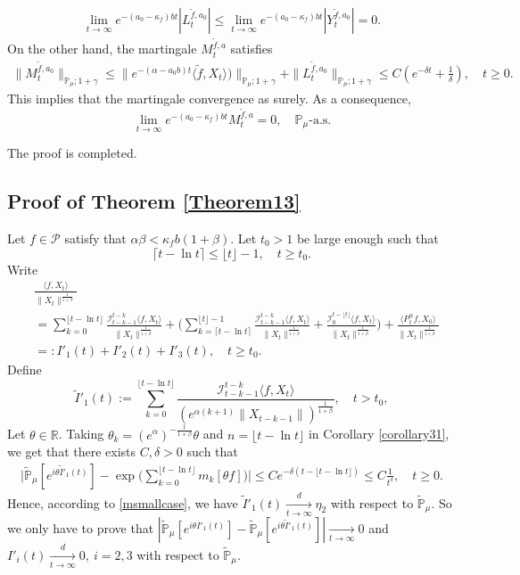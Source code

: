 \documentclass[12pt]{amsart}
\theoremstyle{plain}
\theoremstyle{definition}
\numberwithin{equation}{section}
\begin{document}
\begin{align*}
    \lim_{t\rightarrow \infty}e^{-(a_0 - \kappa_f)bt}|L_t^{\tilde{f},a_0}|
    \leq  \lim_{t\rightarrow \infty}e^{-(a_0 - \kappa_f)bt}|Y_t^{\tilde{f},a_0}|=0.
\end{align*}
	On the other hand, the martingale $M_t^{\tilde{f},a}$ satisfies
\begin{align*}
    \|M_t^{\tilde{f},a_0}\|_{\mathbb{P}_{\mu};1+\gamma}\leq  \|e^{-(\alpha-a_0 b)t}\langle \tilde{f},X_t\rangle)\|_{\mathbb{P}_{\mu};1+\gamma}+\|L_t^{\tilde{f},a_0}\|_{\mathbb{P}_{\mu};1+\gamma}\leq C(e^{-\delta t}+\frac{1}{\delta}),\quad t\geq 0.
\end{align*}
	This implies that the martingale convergence as surely. 
	As a consequence, 
\[
	\lim_{t\rightarrow\infty} e^{-(a_0-\kappa_f)bt}M_t^{\tilde{f},a}
	=0,
	\quad \mathbb P_\mu\text{-a.s.}
\] 
	
	The proof is completed.
\subsection{Proof of Theorem \ref{Theorem13}}
	Let $f\in \mathcal P$ satisfy that $\alpha \beta < \kappa_f b(1+\beta)$. 
	Let $t_0 > 1$ be large enough such that 
\[
	\lceil t - \ln t\rceil 
	\leq \lfloor t \rfloor - 1,
	\quad t\geq t_0.
\]
	Write
\begin{align*}
	&\frac{\langle f,X_t\rangle}{\|X_t\|^{\frac{1}{1+\beta}}}
	\\&=\sum_{k=0}^{\lfloor t-\ln t \rfloor} \frac{\mathcal I_{t-k-1}^{t-k}\langle f ,X_t\rangle}{\|X_t\|^{\frac{1}{1+\beta}}}+ \Big(\sum_{k=\lceil t-\ln t \rceil}^{\lfloor t \rfloor-1} \frac{\mathcal I_{t-k-1}^{t-k}\langle f ,X_t\rangle}{\|X_t\|^{\frac{1}{1+\beta}}}+\frac{\mathcal I_0^{t-\lfloor t \rfloor}\langle f ,X_t\rangle}{\|X_t\|^{\frac{1}{1+\beta}}}\Big) + \frac{\langle P_t^\alpha f, X_0\rangle}{\|X_t\|^{\frac{1}{1+\beta}}}
	\\&=:I'_1(t)+I'_2(t)+I'_3(t),
	\quad t\geq t_0.
\end{align*}
	Define
 \[
 	\tilde I'_1(t)
 	:=\sum_{k=0}^{\lfloor t-\ln t \rfloor}\frac{\mathcal I_{t-k-1}^{t-k}\langle f ,X_t\rangle}{( e^{\alpha(k+1)}\|X_{t-k-1}\|)^{\frac{1}{1+\beta}}},
 	\quad t > t_0,
 \]
    Let $\theta\in \mathbb{R}$. 
    Taking $\theta_k=(e^{\alpha})^{-\frac{1}{1+\beta}} \theta $ and $n={\lfloor t-\ln t \rfloor}$ in Corollary \ref{corollary31}, we get that there exists $C,\delta > 0$ such that
\begin{align*}
    \Big|\mathbb{\tilde{P}}_{\mu} [e^{i\theta\tilde I'_1(t)} ]-\exp\Big(\sum_{k=0}^{\lfloor t-\ln t \rfloor}m_k[\theta f]\Big)\Big|
    \leq C e^{-\delta(t - \lfloor t - \ln t\rfloor)}
    \leq C \frac{1}{t^{\delta}},
    \quad t\geq 0.
\end{align*}
    Hence, according to \eqref{msmallcase}, we have $\tilde I'_1(t)\xrightarrow[t\to \infty]{d} \eta_2$ with respect to $\tilde {\mathbb P}_\mu$.
    So we only have to prove that $|\mathbb{\tilde{P}}_{\mu}[e^{i\theta I'_1(t)}]-\mathbb{\tilde{P}}_{\mu}[e^{i\theta\tilde I'_1(t)}]|\xrightarrow[t\to \infty]{} 0$ and $I'_i(t)\xrightarrow[t\to \infty]{d} 0,~i=2,3$ with respect to $\tilde {\mathbb P}_\mu$.
\end{document}
